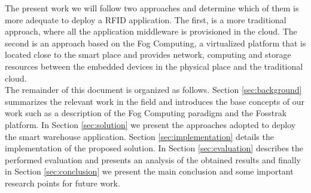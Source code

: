 The present work we will follow two approaches and determine which of them is more adequate to
deploy a \gls{RFID} application. The first, is a more traditional approach, where all the application
middleware is provisioned in the cloud. The second is an approach based on the Fog Computing\cite{bonomi2012fog},
a virtualized platform that is located close to the smart place and provides network, computing and
storage resources between the embedded devices in the physical place and the traditional cloud.\\

The remainder of this document is organized as follows. Section \ref{sec:background} summarizes the
relevant work in the field and introduces the base concepts of our work such as a description of the
Fog Computing paradigm and the Fosstrak platform. In Section \ref{sec:solution} we present the approaches
adopted to deploy the smart warehouse application. Section \ref{sec:implementation} details the
implementation of the proposed solution. In Section \ref{sec:evaluation} describes the performed
evaluation and presents an analysis of the obtained results and finally in Section \ref{sec:conclusion}
we present the main conclusion and some important research points for future work.
